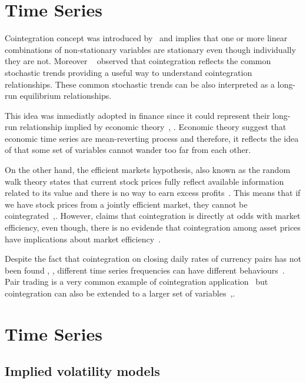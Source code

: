 
\chapter{Time Series}

Cointegration concept was introduced by~\cite{engle1987} and implies that one or
more linear combinations of non-stationary variables are stationary even though
individually they are not.  Moreover ~\cite{stock+watson1988} observed that
cointegration reflects the common stochastic trends providing a useful way to
understand cointegration relationships. These common stochastic trends can be
also interpreted as a long-run equilibrium relationships.

This idea was inmediatly adopted in finance since it could represent their
long-run relationship implied by economic theory~\cite{laietAl1991},
\cite{lence+falk2005}.  Economic theory suggest that economic time series are
mean-reverting process and therefore, it reflects the idea of that some set of
variables cannot wander too far from each other. 

On the other hand, the efficient markets hypothesis, also known as the random
walk theory states that current stock prices fully reflect available
information related to its value and there is no way to earn excess
profits~\cite{fama1970}.  This means that if we have stock prices from a
jointly efficient market, they cannot be
cointegrated~\cite{granger1986},\cite{dwyer1992}. However, \cite{richards1995}
claims that cointegration is directly at odds with market efficiency, even
though, there is no evidende that cointegration among asset prices have
implications about market efficiency~\cite{lence+falk2005}.

Despite the fact that cointegration on closing daily rates of currency pairs has
not been found \cite{coleman1990}, \cite{copeland1991}, different time series
frequencies can have different behaviours~\cite{aldridge2009}. Pair trading is a
very common example of cointegration application~\cite{herlemont2003} 
but cointegration can also be extended to a larger set of
variables~\cite{mukherjee1995},\cite{engle2004}.
\chapter{Time Series}
\section{Implied volatility models}

